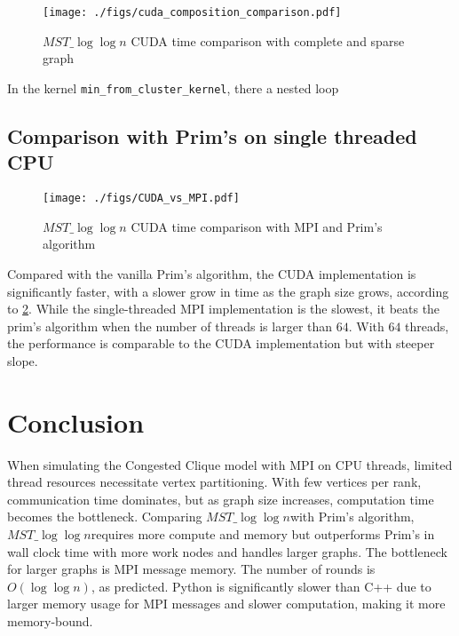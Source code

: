 \documentclass[english, 12pt, a4paper, elec, utf8, a-2b, online]{aaltothesis}
\newcommand{\mstalgo}{$MST\_\log\log{n}$}
\begin{document}
\begin{figure}[h]
	\centering
		\texttt{[image: ./figs/cuda\_composition\_comparison.pdf]}
	\caption{\mstalgo{} CUDA time comparison with complete and sparse graph}
	\label{fig:cuda_composition_comparison.pdf}
\end{figure}

In the kernel \texttt{min\_from\_cluster\_kernel}, there a nested loop




\subsection{Comparison with Prim's on single threaded CPU}
\begin{figure}[h]
	\centering
		\texttt{[image: ./figs/CUDA\_vs\_MPI.pdf]}
	\caption{\mstalgo{} CUDA time comparison with MPI and Prim's algorithm}
	\label{fig:CUDA_vs_MPI.pdf}
\end{figure}

Compared with the vanilla Prim's algorithm, the CUDA implementation is significantly faster, with a slower grow in time as the graph size grows, according to \cref{fig:CUDA_vs_MPI.pdf}. While the single-threaded MPI implementation is the slowest, it beats the prim's algorithm when the number of threads is larger than $64$. With $64$ threads, the performance is comparable to the CUDA implementation but with steeper slope.
\clearpage
\section{Conclusion}
\label{sec:conclusion}
When simulating the Congested Clique model with MPI on CPU threads, limited thread resources necessitate vertex partitioning. With few vertices per rank, communication time dominates, but as graph size increases, computation time becomes the bottleneck. Comparing \mstalgo with Prim's algorithm, \mstalgo requires more compute and memory but outperforms Prim's in wall clock time with more work nodes and handles larger graphs. The bottleneck for larger graphs is MPI message memory. The number of rounds is $O(\log{\log{n}})$, as predicted. Python is significantly slower than C++ due to larger memory usage for MPI messages and slower computation, making it more memory-bound.
\end{document}
